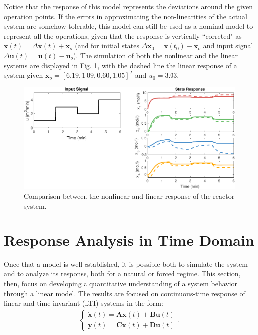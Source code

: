 \documentclass[a4paper,11pt]{book}
\numberwithin{figure}{chapter}
\numberwithin{equation}{chapter}
\numberwithin{table}{chapter}
\theoremstyle{definition}
\begin{document}
Notice that the response of this model represents the deviations around the given operation points. If the errors in approximating the non-linearities of the actual system are somehow tolerable, this model can still be used as a nominal model to represent all the operations, given that the response is vertically ``correted" as $\bm{x}(t) = \Delta \bm{x}(t) + \bm{x}_o$ (and for initial states $\Delta \bm{x}_0 = \bm{x}(t_0) - \bm{x}_o$ and input signal $\Delta \bm{u}(t) = \bm{u}(t) - \bm{u}_o$). The simulation of both the nonlinear and the linear systems are displayed in Fig. \ref{fig:linResp01}, with the dashed line the linear response of a system given $\bm{x}_o = [6.19, 1.09, 0.60, 1.05]^T$ and $u_0 = 3.03$.

\begin{figure}[ht]
    \centering
    \includegraphics[width=\textwidth]{chapter2/linResp01}
    \caption{Comparison between the nonlinear and linear response of the reactor system.}
    \label{fig:linResp01}
\end{figure}

\section{Response Analysis in Time Domain}

Once that a model is well-established, it is possible both to simulate the system and to analyze its response, both for a natural or forced regime. This section, then, focus on developing a quantitative understanding of a system behavior through a linear model. The results are focused on continuous-time response of linear and time-invariant (LTI) systems in the form:
\begin{align}
\begin{cases}
    \dot{\bm{x}}(t) = \bm{A} \bm{x}(t) + \bm{B} \bm{u}(t) \\
    \bm{y}(t) = \bm{C} \bm{x}(t) + \bm{D} \bm{u}(t)
\end{cases}
.\end{align}
\end{document}
